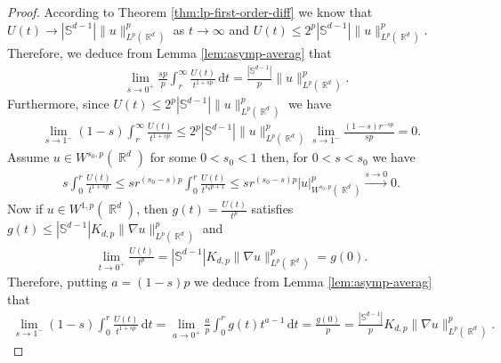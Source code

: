 \documentclass[12pt, reqno]{amsart}%
\theoremstyle{plain}  %
\theoremstyle{definition}  %
\theoremstyle{remark}
\numberwithin{equation}{section}
\DeclareMathOperator{\R}{\mathbb{R}}
\renewcommand{\d}{\,\mathrm{d}}
\begin{document}
\begin{proof}
According to Theorem \ref{thm:lp-first-order-diff} we know that $U(t)\to |\mathbb{S}^{d-1}| \|u\|^p_{L^p(\R^d)}$ as $t\to\infty$ and $U(t)\leq 2^p |\mathbb{S}^{d-1}| \|u\|^p_{L^p(\R^d)}$.  Therefore, we deduce from Lemma \ref{lem:asymp-averag} that
\begin{align*}
&\lim_{s \to 0^+} \frac{sp}{p} \int_r^\infty \frac{U(t)}{t^{1+s p}} \d t = \frac{|\mathbb{S}^{d-1}|}{p} \|u\|^p_{L^p(\R^d)}.
\end{align*}
Furthermore, since $U(t)\leq 2^p|\mathbb{S}^{d-1}|\|u\|^p_{L^p(\R^d)} $ we have
\begin{align*}
\lim_{s\to1^-} (1-s)\int_r^\infty \frac{U(t)}{t^{1+s p}}\leq 2^p|\mathbb{S}^{d-1}|\|u\|^p_{L^p(\R^d)}\lim_{s\to1^-} \frac{(1-s) r^{-sp}}{sp}=0.
\end{align*}
Assume $u\in W^{s_0, p}(\R^d)$ for some  $0<s_0<1$ then, for $0<s<s_0$ we have
\begin{align*}
s\int_0^r \frac{U(t)}{t^{1+s p} }\leq sr^{(s_0-s)p} \int_0^r \frac{U(t)}{t^{s_0p+1} } \leq sr^{(s_0-s)p} |u|^p_{W^{s_0, p}(\R^d)}\xrightarrow{s\to 0}0.
\end{align*}
Now if  $u \in W^{1,p}(\R^d)$,  then  $g(t)=\frac{U(t)}{t^p}$ satisfies $g(t)\leq |\mathbb{S}^{d-1}| K_{d,p} \|\nabla u\|^p_{L^p(\R^d)}$ and
\begin{align*}
\lim_{t \to 0^+} \frac{U(t)}{t^p} = |\mathbb{S}^{d-1}| K_{d,p} \|\nabla u\|^p_{L^p(\R^d)} = g(0).
\end{align*}
Therefore, putting $a = (1 - s)p$  we deduce from Lemma \ref{lem:asymp-averag} that
\begin{align*}
\lim_{s \to 1^-}(1 - s) \int_0^r \frac{U(t)}{t^{1+s p}} \d t = \lim_{a \to 0^+} \frac{a}{p} \int_0^r g(t)t^{a-1}\d t=\frac{g(0)}{p}=   \frac{|\mathbb{S}^{d-1}|}{p} K_{d,p} \|\nabla u\|^p_{L^p(\R^d)}.
\end{align*}
\end{proof}
\end{document}
